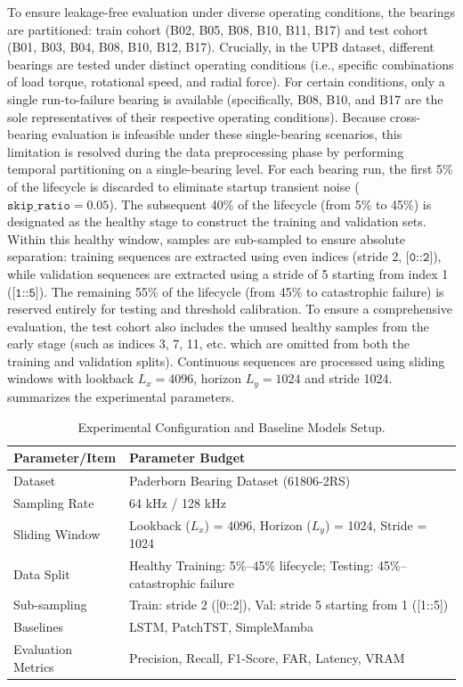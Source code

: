 \documentclass[cmes,article,submit,moreauthors,pdftex]{Definitions/tsp}
\begin{document}
To ensure leakage-free evaluation under diverse operating conditions, the bearings are partitioned: train cohort (B02, B05, B08, B10, B11, B17) and test cohort (B01, B03, B04, B08, B10, B12, B17). Crucially, in the UPB dataset, different bearings are tested under distinct operating conditions (i.e., specific combinations of load torque, rotational speed, and radial force). For certain conditions, only a single run-to-failure bearing is available (specifically, B08, B10, and B17 are the sole representatives of their respective operating conditions). Because cross-bearing evaluation is infeasible under these single-bearing scenarios, this limitation is resolved during the data preprocessing phase by performing temporal partitioning on a single-bearing level. For each bearing run, the first 5\% of the lifecycle is discarded to eliminate startup transient noise ($\texttt{skip\_ratio} = 0.05$). The subsequent 40\% of the lifecycle (from 5\% to 45\%) is designated as the healthy stage to construct the training and validation sets. Within this healthy window, samples are sub-sampled to ensure absolute separation: training sequences are extracted using even indices (stride 2, $\texttt{[0::2]}$), while validation sequences are extracted using a stride of 5 starting from index 1 ($\texttt{[1::5]}$). The remaining 55\% of the lifecycle (from 45\% to catastrophic failure) is reserved entirely for testing and threshold calibration. To ensure a comprehensive evaluation, the test cohort also includes the unused healthy samples from the early stage (such as indices 3, 7, 11, etc. which are omitted from both the training and validation splits). Continuous sequences are processed using sliding windows with lookback $L_x = 4096$, horizon $L_y = 1024$ and stride 1024.  summarizes the experimental parameters.

\begin{table}[htbp]
\tablesize{\footnotesize}
\caption{Experimental Configuration and Baseline Models Setup.}
\label{tabref:table-3}
\begin{tabularx}{\textwidth}{p{3.5cm} L}
\toprule
\textbf{Parameter/Item} & \textbf{Parameter Budget} \\
\midrule
Dataset & Paderborn Bearing Dataset (61806-2RS) \\
Sampling Rate & 64 kHz / 128 kHz \\
Sliding Window & Lookback ($L_x$) = 4096, Horizon ($L_y$) = 1024, Stride = 1024 \\
Data Split & Healthy Training: 5\%–45\% lifecycle; Testing: 45\%--catastrophic failure \\
Sub-sampling & Train: stride 2 ([0::2]), Val: stride 5 starting from 1 ([1::5]) \\
Baselines & LSTM, PatchTST, SimpleMamba \\
Evaluation Metrics & Precision, Recall, F1-Score, FAR, Latency, VRAM \\
\bottomrule
\end{tabularx}
\end{table}
\end{document}
